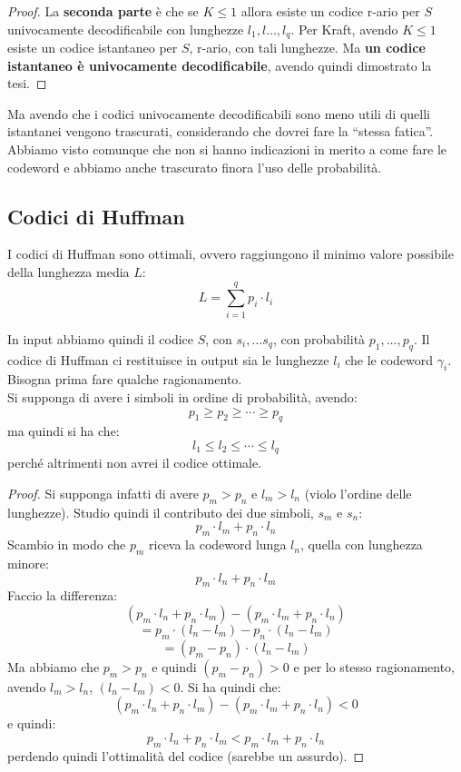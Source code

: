 \documentclass[a4paper,12pt, oneside]{book}
\begin{document}
\begin{proof}
  La \textbf{seconda parte} è che se $K\leq 1$ allora esiste un codice r-ario
  per $S$ univocamente decodificabile con lunghezze $l_1,l\dots,l_q$. Per Kraft,
  avendo $K\leq 1$ esiste un codice istantaneo per $S$, r-ario, con tali
  lunghezze. Ma \textbf{un codice istantaneo è univocamente decodificabile},
  avendo quindi dimostrato la tesi.
\end{proof}
Ma avendo che i codici univocamente decodificabili sono meno utili di quelli
istantanei vengono trascurati, considerando che dovrei fare la ``stessa
fatica''.\\
Abbiamo visto comunque che non si hanno indicazioni in merito a come fare le
codeword e abbiamo anche trascurato finora l'uso delle probabilità.
\subsection{Codici di Huffman}
I codici di Huffman sono ottimali, ovvero raggiungono il minimo valore possibile
della lunghezza media $L$:
\[L=\sum_{i=1}^q p_i\cdot l_i\]
\begin{teorema}
  In input abbiamo quindi il codice $S$, con $s_i,\ldots s_q$, con probabilità
  $p_1,\ldots, p_q$. Il codice di Huffman ci restituisce in output sia le
  lunghezze $l_i$ che le codeword $\gamma_i$.\\
  Bisogna prima fare qualche ragionamento.\\
  Si supponga di avere i simboli in ordine di probabilità, avendo:
  \[p_1\geq p_2\geq \cdots\geq p_q\]
  ma quindi si ha che:
  \[l_1\leq l_2\leq \cdots \leq l_q\]
  perché altrimenti non avrei il codice ottimale.
\end{teorema}
\begin{proof}
  Si supponga infatti di avere
  $p_m>p_n$ e $l_m>l_n$ (violo l'ordine delle lunghezze). Studio quindi il
  contributo dei due simboli, $s_m$ e $s_n$: 
  \[p_m\cdot l_m+p_n\cdot l_n\]
  Scambio in modo che $p_m$ riceva la codeword lunga $l_n$, quella con lunghezza
  minore:
  \[p_m\cdot l_n+p_n\cdot l_m\]
  Faccio la differenza:
  \[(p_m\cdot l_n+p_n\cdot l_m)-(p_m\cdot l_m+p_n\cdot l_n)\]
  \[=p_m\cdot (l_n-l_m)-p_n\cdot (l_n-l_m)\]
  \[=(p_m-p_n)\cdot(l_n-l_m)\]
  Ma abbiamo che $p_m>p_n$ e quindi $(p_m-p_n)>0$ e per lo stesso ragionamento,
  avendo $l_m>l_n$, $(l_n-l_m)<0$. Si ha quindi che:
  \[(p_m\cdot l_n+p_n\cdot l_m)-(p_m\cdot l_m+p_n\cdot l_n)<0\]
  e quindi:
  \[p_m\cdot l_n+p_n\cdot l_m<p_m\cdot l_m+p_n\cdot l_n\]
  perdendo quindi l'ottimalità del codice (sarebbe un assurdo). 
\end{proof}
\end{document}
